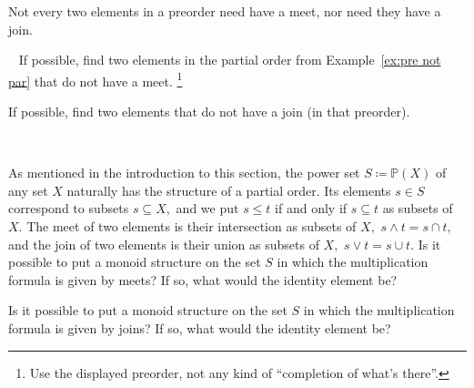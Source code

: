 \documentclass[../main/CT4S-EN-RU]{subfiles}
\begin{document}
\begin{exerciseRUS}
\end{exerciseRUS}

\begin{blockENG}
Not every two elements in a preorder need have a meet, nor need they have a join. 
\end{blockENG}

\begin{blockRUS}
\end{blockRUS}

\begin{exerciseENG}\label{exc:not all meets and joins}~
\sexc If possible, find two elements in the partial order from Example~\ref{ex:pre not par} that do not have a meet.
\footnote{Use the displayed preorder, not any kind of “completion of what's there”.} 
\item If possible, find two elements that do not have a join (in that preorder).
\endsexc
\end{exerciseENG}

\begin{exerciseRUS}\label{exc:not all meets and joins}~
\end{exerciseRUS}

\begin{exerciseENG}
As mentioned in the introduction to this section, the power set $S{\coloneqq}{ℙ}(X)$ of any set $X$ naturally has the structure of a partial order. Its elements $s\in S$ correspond to subsets $s\subseteq X,$ and we put $s\leq t$ if and only if $s\subseteq t$ as subsets of $X.$ The meet of two elements is their intersection as subsets of $X,$ $s\wedge t= s\cap t,$ and the join of two elements is their union as subsets of $X,$ $s\vee t=s\cup t.$
\sexc Is it possible to put a monoid structure on the set $S$ in which the multiplication formula is given by meets? If so, what would the identity element be?
\item Is it possible to put a monoid structure on the set $S$ in which the multiplication formula is given by joins? If so, what would the identity element be?
\endsexc
\end{exerciseENG}

\begin{exerciseRUS}
\end{exerciseRUS}
\end{document}
